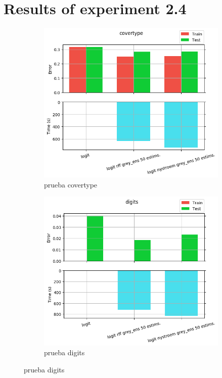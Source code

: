 
\chapter{Results of experiment 2.4} %

\label{Appendix2-4} %

\begin{figure}[ht]
  \centering
  \begin{subfigure}[b]{0.5\linewidth}
    \centering\captionsetup{width=.8\linewidth}\includegraphics[width=\imgscale\linewidth]{Figures/2_4/covertype}
    \caption{prueba covertype}
    \label{fig:2_4_covertype}
  \end{subfigure}%
  \begin{subfigure}[b]{0.5\linewidth}
    \centering\captionsetup{width=.8\linewidth}\includegraphics[width=\imgscale\linewidth]{Figures/2_4/digits}
    \caption{prueba digits}
    \label{fig:2_4_digits}
  \end{subfigure}
\end{figure}


